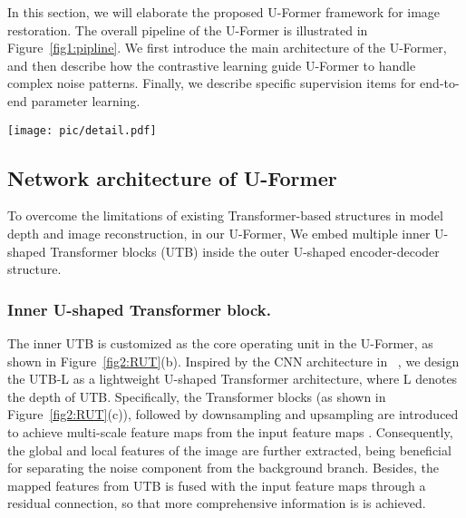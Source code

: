

In this section, we will elaborate the proposed U-Former framework for image restoration. The overall pipeline of the U-Former is illustrated in Figure~\ref{fig1:pipline}. We first introduce the main architecture of the U-Former, and then describe how the contrastive learning guide U-Former to handle complex noise patterns. Finally, we describe specific supervision items for end-to-end parameter learning.

\begin{figure*}[!htbp]
    \centering
    \begin{minipage}[b]{0.95\linewidth}
    \texttt{[image: pic/detail.pdf]}\vspace{4pt}
    \end{minipage}
    \vspace{-5pt}
    \caption{Main architecture our proposed U-Former for image restoration. (a) presents the outer U-shaped encoder-decoder structure, where each stage consists of an inner U-shaped Transformer Block (UTB) with different depth L as shown in (b). The detailed structure of the Transformer block in UTB is shown in (c), where we proposed a novel Feature-Filtering Window-based Multi-head Self-Attention (FW-MSA) for reducing the computational cost. The detailed structure of Feature-Filtering is illustrated in (d). Finally we introduce depthwise separable convolution in the Feed-Forward Network (FFN) for further capturing local dependencies as shown in (e).}
    \label{fig2:RUT}
    \vspace{-10pt}
\end{figure*}
\subsection{Network architecture of U-Former}
To overcome the limitations of existing Transformer-based structures in model depth and image reconstruction, in our U-Former, We embed multiple inner U-shaped Transformer blocks (UTB) inside the outer U-shaped encoder-decoder structure.


\subsubsection{Inner U-shaped Transformer block.}
The inner UTB is customized as the core operating unit in the U-Former, as shown in Figure~\ref{fig2:RUT}(b). 
Inspired by the CNN architecture in ~\cite{qin2020u2,szegedy2015going}, we design the UTB-L as a lightweight U-shaped Transformer architecture, where L denotes the depth of UTB. Specifically, the Transformer blocks (as shown in Figure~\ref{fig2:RUT}(c)), followed by downsampling and upsampling are introduced to achieve multi-scale feature maps from the input feature maps . Consequently, the global and local features of the image are further extracted, being beneficial for separating the noise component from the background branch. Besides, the mapped features  from UTB is fused with the input feature maps  through a residual connection, so that more comprehensive information is  is achieved.


